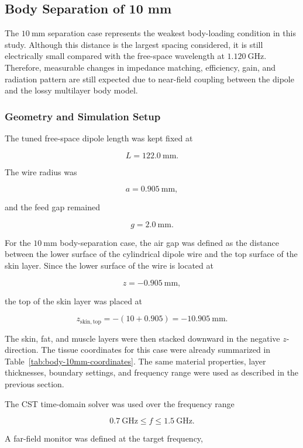 \subsection{Body Separation of 10 mm}

The \(10~\mathrm{mm}\) separation case represents the weakest body-loading condition in this study. Although this distance is the largest spacing considered, it is still electrically small compared with the free-space wavelength at \(1.120~\mathrm{GHz}\). Therefore, measurable changes in impedance matching, efficiency, gain, and radiation pattern are still expected due to near-field coupling between the dipole and the lossy multilayer body model.

\subsubsection{Geometry and Simulation Setup}

The tuned free-space dipole length was kept fixed at

\[
L = 122.0~\mathrm{mm}.
\]

The wire radius was

\[
a = 0.905~\mathrm{mm},
\]

and the feed gap remained

\[
g = 2.0~\mathrm{mm}.
\]

For the \(10~\mathrm{mm}\) body-separation case, the air gap was defined as the distance between the lower surface of the cylindrical dipole wire and the top surface of the skin layer. Since the lower surface of the wire is located at

\[
z=-0.905~\mathrm{mm},
\]

the top of the skin layer was placed at

\[
z_{\mathrm{skin,top}}=-(10+0.905)
=
-10.905~\mathrm{mm}.
\]

The skin, fat, and muscle layers were then stacked downward in the negative \(z\)-direction. The tissue coordinates for this case were already summarized in Table~\ref{tab:body-10mm-coordinates}. The same material properties, layer thicknesses, boundary settings, and frequency range were used as described in the previous section.

The CST time-domain solver was used over the frequency range

\[
0.7~\mathrm{GHz} \leq f \leq 1.5~\mathrm{GHz}.
\]

A far-field monitor was defined at the target frequency,

